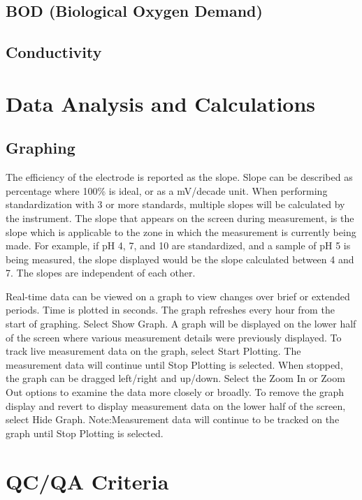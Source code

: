 \documentclass[12pt]{../SOP3_beta}\usepackage[]{graphicx}\usepackage[]{color}
\begin{document}
\subsection{BOD (Biological Oxygen Demand)}

\subsection{Conductivity}


\section{Data Analysis and Calculations}

\subsection{Graphing}
\NP The efficiency of the electrode is reported as the slope. Slope can be described as percentage where 100\% is ideal, or as a mV/decade unit. When performing  standardization with 3 or more standards, multiple slopes will be calculated by the  instrument. The slope that appears on the screen during measurement, is the slope which is applicable to the zone in which the measurement is currently being made. For example, if pH 4, 7, and 10 are standardized, and a sample of pH 5 is being measured, the slope displayed would be the slope calculated between 4 and 7. The slopes are independent of each other. 

\NP Real-time data can be viewed on a graph to view changes over brief or  extended  periods. Time  is  plotted  in  seconds. The  graph  refreshes  every  hour  from  the  start of graphing.
\NP Select Show Graph. A graph will be displayed on the lower half of the screen where various measurement details were previously displayed.  
\NP To track live measurement data on the graph, select 
Start Plotting. The measurement data will continue until 
Stop Plotting is selected. When stopped, the graph can be dragged left/right and up/down.
\NP Select the Zoom In or Zoom Out options to examine the data more closely or broadly.
\NP To remove the graph display and revert to display measurement data on the lower half of the screen, select Hide Graph. Note:Measurement  data  will  continue  to  be  tracked  on  the  graph  until  Stop  Plotting is  selected.  

\section{QC/QA Criteria}
\end{document}
